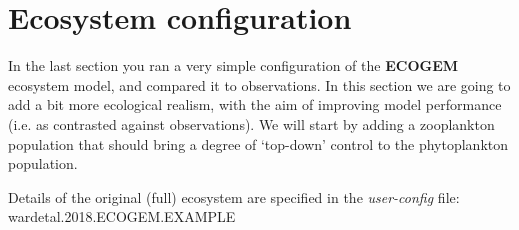 \documentclass[11pt,fleqn]{book} %
\begin{document}
\newpage


\section{Ecosystem configuration}

In the last section you ran a very simple configuration of the \textbf{ECOGEM} ecosystem model, and compared it to observations. In this section we are going to add a bit more ecological realism, with the aim of improving model performance (i.e. as contrasted against observations). We will start by adding a zooplankton population that  should bring a degree of `top-down' control to the phytoplankton population.
\vspace{2mm}

Details of the original (full) ecosystem are specified in the \textit{user-config} file:\\ \indent \textsf{\footnotesize wardetal.2018.ECOGEM.EXAMPLE}
\end{document}
